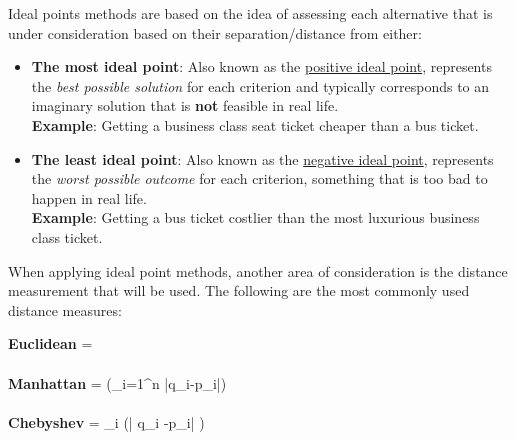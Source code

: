 \documentclass[10pt, a4paper]{article}
\begin{document}
Ideal points methods are based on the idea of assessing each alternative that is under consideration based on their separation/distance from either:
\begin{itemize}
    \item \textbf{The most ideal point}: Also known as the \underline{positive ideal point}, represents the \emph{best possible solution} for each criterion and typically corresponds to an imaginary solution that is \textbf{not} feasible in real life. \\
    \textbf{Example}: Getting a business class seat ticket cheaper than a bus ticket.
    \item \textbf{The least ideal point}: Also known as the \underline{negative ideal point}, represents the \emph{worst possible outcome} for each criterion, something that is too bad to happen in real life. \\
    \textbf{Example}: Getting a bus ticket costlier than the most luxurious business class ticket.
\end{itemize}
When applying ideal point methods, another area of consideration is the distance measurement that will be used. 
The following are the most commonly used distance measures: 

\begin{center}

\textbf{Euclidean} =  \\~\\
\textbf{Manhattan} = (\sum_{i=1}^n |q_i-p_i|)
\\~\\
\textbf{Chebyshev} = \max_{i} (| q_{i} -p_{i}| )

\end{center}
\end{document}
